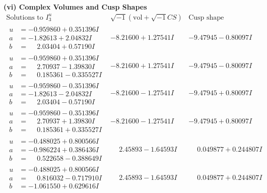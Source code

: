 \documentclass[1p]{elsarticle_modified}
\theoremstyle{definition}
\newcommand{\I}{\sqrt{-1}}
\begin{document}
\newpage\flushleft \textbf{(vi) Complex Volumes and Cusp Shapes}
$$\begin{array}{c|c|c}  
\text{Solutions to }I^u_{3}& \I (\text{vol} + \sqrt{-1}CS) & \text{Cusp shape}\\
 \hline 
\begin{aligned}
u &= -0.959860 + 0.351396 I \\
a &= -1.82613 + 2.04832 I \\
b &= \phantom{-}2.03404 + 0.57190 I\end{aligned}
 & -8.21600 + 1.27541 I & -9.47945 - 0.80097 I \\ \hline\begin{aligned}
u &= -0.959860 + 0.351396 I \\
a &= \phantom{-}2.70937 - 1.39830 I \\
b &= \phantom{-}0.185361 - 0.335527 I\end{aligned}
 & -8.21600 + 1.27541 I & -9.47945 - 0.80097 I \\ \hline\begin{aligned}
u &= -0.959860 - 0.351396 I \\
a &= -1.82613 - 2.04832 I \\
b &= \phantom{-}2.03404 - 0.57190 I\end{aligned}
 & -8.21600 - 1.27541 I & -9.47945 + 0.80097 I \\ \hline\begin{aligned}
u &= -0.959860 - 0.351396 I \\
a &= \phantom{-}2.70937 + 1.39830 I \\
b &= \phantom{-}0.185361 + 0.335527 I\end{aligned}
 & -8.21600 - 1.27541 I & -9.47945 + 0.80097 I \\ \hline\begin{aligned}
u &= -0.488025 + 0.800566 I \\
a &= -0.986224 + 0.386436 I \\
b &= \phantom{-}0.522658 - 0.388649 I\end{aligned}
 & \phantom{-}2.45893 - 1.64593 I & \phantom{-}0.049877 + 0.244807 I \\ \hline\begin{aligned}
u &= -0.488025 + 0.800566 I \\
a &= \phantom{-}0.816032 - 0.717910 I \\
b &= -1.061550 + 0.629616 I\end{aligned}
 & \phantom{-}2.45893 - 1.64593 I & \phantom{-}0.049877 + 0.244807 I \\ \hline\begin{aligned}

\end{aligned}
\end{array}$$
\end{document}
